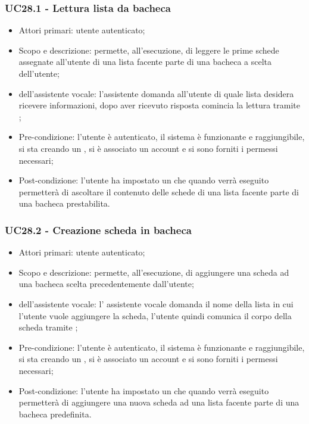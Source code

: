 \subsubsection{UC28.1 - Lettura lista da bacheca }
\begin{itemize}
	\item  Attori primari: utente autenticato;
	\item  Scopo e descrizione: permette, all'esecuzione, di leggere le prime schede assegnate all'utente di una lista facente parte di una bacheca a scelta dell'utente;
	\item  {} dell'assistente vocale: l'assistente domanda all'utente di quale lista desidera ricevere informazioni, dopo aver ricevuto risposta comincia la lettura tramite ;
	\item  Pre-condizione: l'utente è autenticato, il sistema è funzionante e raggiungibile, si sta creando un , si è associato un account  e si sono forniti i permessi necessari;
	\item  Post-condizione: l'utente ha impostato un  che quando verrà eseguito permetterà di ascoltare il contenuto delle schede di una lista facente parte di una bacheca prestabilita.
\end{itemize}
\subsubsection{UC28.2 - Creazione scheda in bacheca }
\begin{itemize}
	\item  Attori primari: utente autenticato;
	\item  Scopo e descrizione: permette, all'esecuzione, di aggiungere una scheda ad una bacheca scelta precedentemente dall'utente;
	\item  {} dell'assistente vocale: l' assistente vocale domanda il nome della lista in cui l'utente vuole aggiungere la scheda, l'utente quindi comunica il corpo della scheda tramite ;
	\item  Pre-condizione: l'utente è autenticato, il sistema è funzionante e raggiungibile, si sta creando un , si è associato un account  e si sono forniti i permessi necessari;
	\item  Post-condizione: l'utente ha impostato un  che quando verrà eseguito permetterà di aggiungere una nuova scheda ad una lista facente parte di una bacheca predefinita.
\end{itemize}
